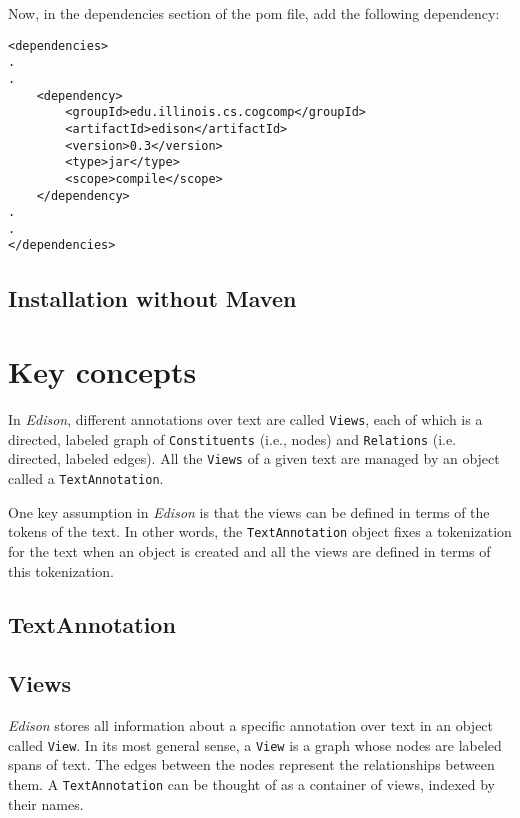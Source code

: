 \documentclass[11pt]{article}
\begin{document}
   Now, in the dependencies section of the pom file, add the following
   dependency:



\lstset{frame=lines,basicstyle=\footnotesize,numbers=left,captionpos=b,showstringspaces=false,numberstyle=\tiny,language=XML}
\begin{lstlisting}
<dependencies>
.
.
    <dependency>
        <groupId>edu.illinois.cs.cogcomp</groupId>
        <artifactId>edison</artifactId>
        <version>0.3</version>
        <type>jar</type>
        <scope>compile</scope>
    </dependency>
.
.
</dependencies>
\end{lstlisting}
   
\subsection{Installation without Maven}
\label{sec-2-2}

   
\section{Key concepts}
\label{sec-3}

In \emph{Edison}, different annotations over text are called \texttt{Views}, each
of which is a directed, labeled graph of \texttt{Constituents} (i.e., nodes)
and \texttt{Relations} (i.e. directed, labeled edges). All the \texttt{Views} of a
given text are managed by an object called a \texttt{TextAnnotation}.

One key assumption in \emph{Edison} is that the views can be defined in
terms of the tokens of the text. In other words, the \texttt{TextAnnotation}
object fixes a tokenization for the text when an object is created and
all the views are defined in terms of this tokenization.
\subsection{TextAnnotation}
\label{sec-3-1}
\subsection{Views}
\label{sec-3-2}


\emph{Edison} stores all information about a specific annotation over text
in an object called \texttt{View}. In its most general sense, a \texttt{View} is a
graph whose nodes are labeled spans of text. The edges between the
nodes represent the relationships between them. A \texttt{TextAnnotation} can
be thought of as a container of views, indexed by their names.
\end{document}
